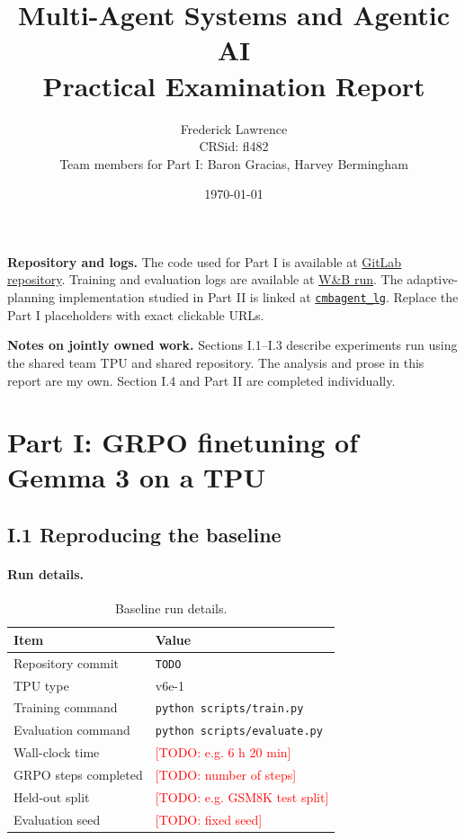 \documentclass[11pt,a4paper]{article}
\title{Multi-Agent Systems and Agentic AI\\Practical Examination Report}
\author{Frederick Lawrence \\ CRSid: fl482 \\ Team members for Part I: Baron Gracias, Harvey Bermingham}
\date{\today}
\newcommand{\code}[1]{\texttt{#1}}
\newcommand{\repo}{\href{https://gitlab.developers.cam.ac.uk/YOUR-CRSID/YOUR-REPO}{GitLab repository}}
\newcommand{\wandb}{\href{https://wandb.ai/YOUR-PROJECT/YOUR-RUN}{W\&B run}}
\newcommand{\cmbcommit}{\href{https://github.com/borisbolliet/cmbagent_lg/tree/d7d0592a714e4cc01c97f1b77afdd57a208b18db}{\code{cmbagent\_lg}}}
\newcommand{\TODO}[1]{\textcolor{red}{[TODO: #1]}}
\begin{document}
\maketitle

\noindent\textbf{Repository and logs.}
The code used for Part I is available at \repo. Training and evaluation logs are available at \wandb. The adaptive-planning implementation studied in Part II is linked at \cmbcommit. Replace the Part I placeholders with exact clickable URLs.

\vspace{0.5em}
\noindent\textbf{Notes on jointly owned work.}
Sections I.1--I.3 describe experiments run using the shared team TPU and shared repository. The analysis and prose in this report are my own. Section I.4 and Part II are completed individually.

\tableofcontents
\newpage

\section*{Part I: GRPO finetuning of Gemma 3 on a TPU}

\subsection*{I.1 Reproducing the baseline}

\paragraph{Run details.}
\begin{table}[H]
    \centering
    \caption{Baseline run details.}
    \label{tab:baseline-run-details}
    \begin{tabular}{ll}
        \toprule
        Item & Value \\
        \midrule
        Repository commit & \code{TODO} \\
        TPU type & v6e-1 \\
        Training command & \code{python scripts/train.py} \\
        Evaluation command & \code{python scripts/evaluate.py} \\
        Wall-clock time & \TODO{e.g. 6 h 20 min} \\
        GRPO steps completed & \TODO{number of steps} \\
        Held-out split & \TODO{e.g. GSM8K test split} \\
        Evaluation seed & \TODO{fixed seed} \\
        \bottomrule
    \end{tabular}
\end{table}
\end{document}
